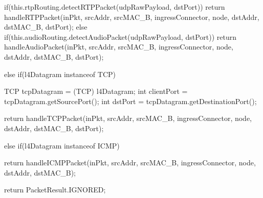 \documentclass[a4paper,11pt]{book}
\begin{document}
\begin{java}
{{{{            if(this.rtpRouting.detectRTPPacket(udpRawPayload, dstPort)){
              return handleRTPPacket(inPkt, srcAddr, srcMAC_B, ingressConnector, node, dstAddr, dstMAC_B, dstPort);
            }
            else if(this.audioRouting.detectAudioPacket(udpRawPayload, dstPort)){
              return handleAudioPacket(inPkt, srcAddr, srcMAC_B, ingressConnector, node, dstAddr, dstMAC_B, dstPort);
            }

          }else if(l4Datagram instanceof TCP){
            TCP tcpDatagram = (TCP) l4Datagram;
            int clientPort = tcpDatagram.getSourcePort();
            int dstPort = tcpDatagram.getDestinationPort();

            return handleTCPPacket(inPkt, srcAddr, srcMAC_B, ingressConnector, node, dstAddr, dstMAC_B, dstPort);
          }else   if(l4Datagram instanceof ICMP){

              return handleICMPPacket(inPkt, srcAddr, srcMAC_B, ingressConnector, node, dstAddr, dstMAC_B);
          }
        }
      }
      return PacketResult.IGNORED;
    }
\end{java}

\newpage
\end{document}
